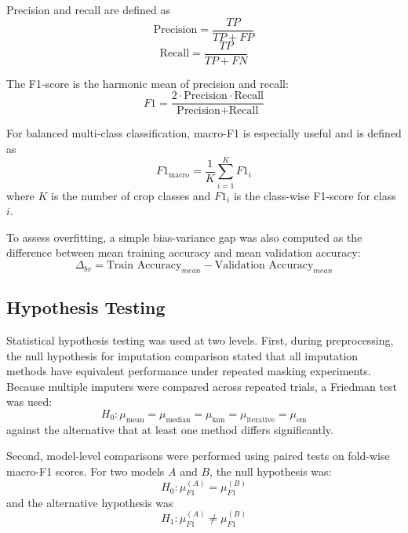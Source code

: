 \documentclass[conference]{IEEEtran}
\begin{document}
Precision and recall are defined as
\begin{equation}
\text{Precision} = \frac{TP}{TP + FP}
\end{equation}
\begin{equation}
\text{Recall} = \frac{TP}{TP + FN}
\end{equation}

The F1-score is the harmonic mean of precision and recall:
\begin{equation}
F1 = \frac{2 \cdot \text{Precision} \cdot \text{Recall}}{\text{Precision} + \text{Recall}}
\end{equation}

For balanced multi-class classification, macro-F1 is especially useful and is defined as
\begin{equation}
F1_{\text{macro}} = \frac{1}{K}\sum_{i=1}^{K} F1_i
\end{equation}
where $K$ is the number of crop classes and $F1_i$ is the class-wise F1-score for class $i$.

To assess overfitting, a simple bias-variance gap was also computed as the difference between mean training accuracy and mean validation accuracy:
\begin{equation}
\Delta_{bv} = \text{Train Accuracy}_{mean} - \text{Validation Accuracy}_{mean}
\end{equation}

\subsection{Hypothesis Testing}
Statistical hypothesis testing was used at two levels. First, during preprocessing, the null hypothesis for imputation comparison stated that all imputation methods have equivalent performance under repeated masking experiments. Because multiple imputers were compared across repeated trials, a Friedman test was used:
\begin{equation}
H_0: \mu_{\text{mean}} = \mu_{\text{median}} = \mu_{\text{knn}} = \mu_{\text{iterative}} = \mu_{\text{em}}
\end{equation}
against the alternative that at least one method differs significantly.

Second, model-level comparisons were performed using paired tests on fold-wise macro-F1 scores. For two models $A$ and $B$, the null hypothesis was:
\begin{equation}
H_0: \mu_{F1}^{(A)} = \mu_{F1}^{(B)}
\end{equation}
and the alternative hypothesis was
\begin{equation}
H_1: \mu_{F1}^{(A)} \neq \mu_{F1}^{(B)}
\end{equation}
\end{document}
